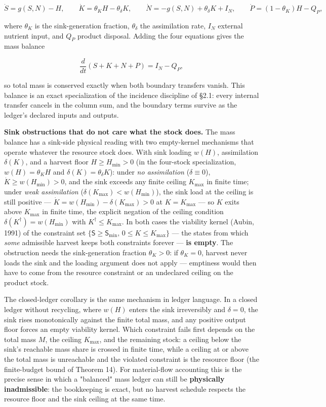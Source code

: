 \documentclass[11pt]{article}
\begin{document}
$$\dot S = g(S,N) - H, \qquad \dot K = \theta_K H - \theta_\delta K, \qquad \dot N = -g(S,N) + \theta_\delta K + I_N, \qquad \dot P = (1 - \theta_K)H - Q_P,$$

 where \(\theta_K\) is the sink-generation fraction, \(\theta_\delta\) the assimilation rate, \(I_N\) external nutrient input, and \(Q_P\) product disposal. Adding the four equations gives the mass balance 

$$\frac{d}{dt}(S + K + N + P) = I_N - Q_P,$$

 so total mass is conserved exactly when both boundary transfers vanish. This balance is an exact specialization of the incidence discipline of \S2.1: every internal transfer cancels in the column sum, and the boundary terms survive as the ledger's declared inputs and outputs.

\textbf{Sink obstructions that do not care what the stock does.} The mass balance has a sink-side physical reading with two empty-kernel mechanisms that operate whatever the resource stock does. With sink loading \(w(H)\), assimilation \(\delta(K)\), and a harvest floor \(H \ge H_{\min} > 0\) (in the four-stock specialization, \(w(H) = \theta_K H\) and \(\delta(K) = \theta_\delta K\)): under \emph{no assimilation} (\(\delta \equiv 0\)), \(\dot K \ge w(H_{\min}) > 0\), and the sink exceeds any finite ceiling \(K_{\max}\) in finite time; under \emph{weak assimilation} (\(\delta(K_{\max}) < w(H_{\min})\)), the sink load at the ceiling is still positive --- \(\dot K =\allowbreak{} w(H_{\min}) - \delta(K_{\max}) > 0\) at \(K = K_{\max}\) --- so \(K\) exits above \(K_{\max}\) in finite time, the explicit negation of the ceiling condition \(\delta(K^\dagger) =\allowbreak{} w(H_{\min})\) with \(K^\dagger \le K_{\max}\). In both cases the viability kernel (Aubin, 1991) of the constraint set \(\{\mathsf S\ge \mathsf S_{\min},\allowbreak{}\,\allowbreak{}0\le K\le K_{\max}\}\) --- the states from which \emph{some} admissible harvest keeps both constraints forever --- \textbf{is empty}. The obstruction needs the sink-generation fraction \(\theta_K > 0\): if \(\theta_K = 0\), harvest never loads the sink and the loading argument does not apply --- emptiness would then have to come from the resource constraint or an undeclared ceiling on the product stock.

The closed-ledger corollary is the same mechanism in ledger language. In a closed ledger without recycling, where \(w(H)\) enters the sink irreversibly and \(\delta = 0\), the sink rises monotonically against the finite total mass, and any positive output floor forces an empty viability kernel. Which constraint fails first depends on the total mass \(M\), the ceiling \(K_{\max}\), and the remaining stock: a ceiling below the sink's reachable mass share is crossed in finite time, while a ceiling at or above the total mass is unreachable and the violated constraint is the resource floor (the finite-budget bound of Theorem 14). For material-flow accounting this is the precise sense in which a "balanced" mass ledger can still be \textbf{physically inadmissible}: the bookkeeping is exact, but no harvest schedule respects the resource floor and the sink ceiling at the same time.
\end{document}
